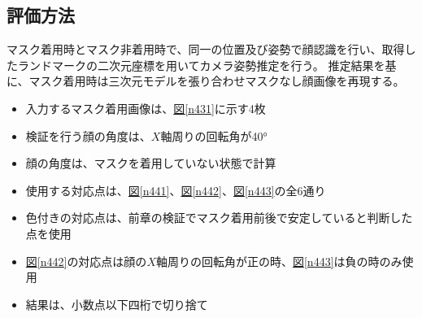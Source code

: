 \documentclass[]{jarticle}          %
\begin{document}
\subsection{評価方法}
マスク着用時とマスク非着用時で、同一の位置及び姿勢で顔認識を行い、取得したランドマークの二次元座標を用いてカメラ姿勢推定を行う。
推定結果を基に、マスク着用時は三次元モデルを張り合わせマスクなし顔画像を再現する。
\begin{itemize}
  \item 入力するマスク着用画像は、\hyperref[n431]{図\ref{n431}}に示す4枚
  \item 検証を行う顔の角度は、$X$軸周りの回転角が40°
  \item 顔の角度は、マスクを着用していない状態で計算
  \item 使用する対応点は、\hyperref[n441]{図\ref{n441}}、\hyperref[n442]{図\ref{n442}}、\hyperref[n443]{図\ref{n443}}の全6通り
  \item 色付きの対応点は、前章の検証でマスク着用前後で安定していると判断した点を使用
  \item \hyperref[n442]{図\ref{n442}}の対応点は顔の$X$軸周りの回転角が正の時、\hyperref[n443]{図\ref{n443}}は負の時のみ使用
  \item 結果は、小数点以下四桁で切り捨て
\end{itemize}
\end{document}
